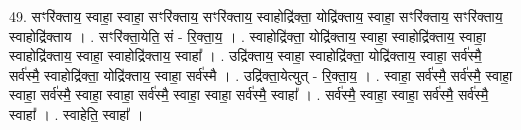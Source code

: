 \documentclass[17pt]{extarticle}
\begin{document}
49. सꣳरि॑क्ताय॒ स्वाहा॒ स्वाहा॒ सꣳरि॑क्ताय॒ सꣳरि॑क्ताय॒ स्वाहोद्रि॑क्ता॒ योद्रि॑क्ताय॒ स्वाहा॒ सꣳरि॑क्ताय॒ सꣳरि॑क्ताय॒ स्वाहोद्रि॑क्ताय । . सꣳरि॑क्ता॒येति॒ सं - रि॒क्ता॒य॒ । . स्वाहोद्रि॑क्ता॒ योद्रि॑क्ताय॒ स्वाहा॒ स्वाहोद्रि॑क्ताय॒ स्वाहा॒ स्वाहोद्रि॑क्ताय॒ स्वाहा॒ स्वाहोद्रि॑क्ताय॒ स्वाहा᳚ । . उद्रि॑क्ताय॒ स्वाहा॒ स्वाहोद्रि॑क्ता॒ योद्रि॑क्ताय॒ स्वाहा॒ सर्व॑स्मै॒ सर्व॑स्मै॒ स्वाहोद्रि॑क्ता॒ योद्रि॑क्ताय॒ स्वाहा॒ सर्व॑स्मै । . उद्रि॑क्ता॒येत्युत् - रि॒क्ता॒य॒ । . स्वाहा॒ सर्व॑स्मै॒ सर्व॑स्मै॒ स्वाहा॒ स्वाहा॒ सर्व॑स्मै॒ स्वाहा॒ स्वाहा॒ सर्व॑स्मै॒ स्वाहा॒ स्वाहा॒ सर्व॑स्मै॒ स्वाहा᳚ । . सर्व॑स्मै॒ स्वाहा॒ स्वाहा॒ सर्व॑स्मै॒ सर्व॑स्मै॒ स्वाहा᳚ । . स्वाहेति॒ स्वाहा᳚ । \newline
\pagebreak
\end{document}
